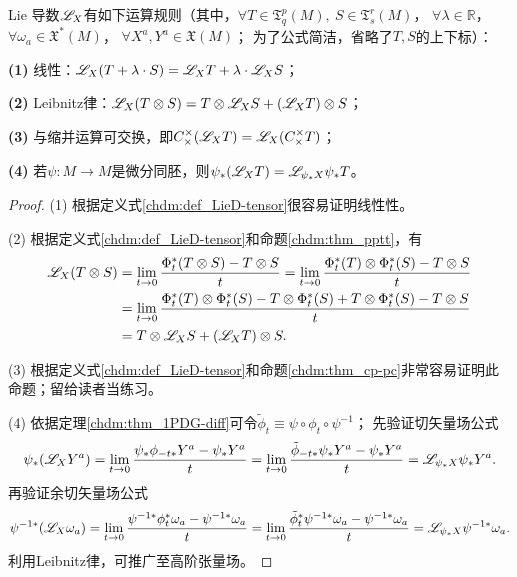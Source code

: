 \begin{theorem}\label{chdm:thm_LieD-property}
    Lie 导数$\mathscr{L}_{X}$有如下运算规则（其中，$\forall T\in \mathfrak{T}^p_q(M),\ S\in \mathfrak{T}^r_s(M)$，
    $\forall \lambda \in \mathbb{R}$， $\forall \omega_a\in \mathfrak{X}^*(M)$，
    $\forall X^a,Y^a\in \mathfrak{X}(M)$；
    为了公式简洁，省略了$T,S$的上下标）：
    
    {\bfseries (1)} 线性：$\mathscr{L}_{X}(T + \lambda \cdot S) = \mathscr{L}_{X}T + \lambda\cdot \mathscr{L}_{X}S$；
    
    {\bfseries (2)} Leibnitz律：$\mathscr{L}_{X} (T \otimes S) = T \otimes \mathscr{L}_{X} S + (\mathscr{L}_{X} T )\otimes S$；
    
    {\bfseries (3)} 与缩并运算可交换，即$C^\times_\times (\mathscr{L}_{X} T) =  \mathscr{L}_{X} (C^\times_\times T) $；
    
    
    
    {\bfseries (4)} 若$\psi:M\to M$是微分同胚，则$\psi_*(\mathscr{L}_{X} T) = \mathscr{L}_{\psi_*X} \psi_* T$。
\end{theorem}
\begin{proof}
    (1) 根据定义式\eqref{chdm:def_LieD-tensor}很容易证明线性性。
    
    (2) 根据定义式\eqref{chdm:def_LieD-tensor}和命题\ref{chdm:thm_pptt}，有
    \begin{align*}
        \mathscr{L}_{X} (T \otimes S) & = \lim_{t\to 0} \frac{\Phi^{*}_{t} (T\otimes S) -T\otimes S }{t} 
          = \lim_{t\to 0} \frac{\Phi^{*}_{t} (T)\otimes \Phi^{*}_{t}(S) -T\otimes S }{t}\\
        & = \lim_{t\to 0} \frac{\Phi^{*}_{t} (T)\otimes \Phi^{*}_{t}(S) 
             -T\otimes \Phi^{*}_{t}(S) +T\otimes \Phi^{*}_{t}(S) -T\otimes S }{t} \\
        & = T \otimes \mathscr{L}_{X} S + (\mathscr{L}_{X} T )\otimes S .
    \end{align*}

    (3) 根据定义式\eqref{chdm:def_LieD-tensor}和命题\ref{chdm:thm_cp-pc}非常容易证明此命题；留给读者当练习。


    (4) 依据定理\ref{chdm:thm_1PDG-diff}可令$\tilde{\phi}_t \equiv \psi \circ \phi_t \circ \psi^{-1}$；
    先验证切矢量场公式
    \begin{equation*}
        \psi_*(\mathscr{L}_{X} Y^a)  = \lim_{t\to 0} \frac{\psi_*{\phi}_{-t*} Y^a - \psi_*Y^a }{t} 
       = \lim_{t\to 0} \frac{\tilde{\phi}_{-t*} \psi_*Y^a -\psi_*Y^a }{t} 
       =\mathscr{L}_{\psi_*X} \psi_*Y^a .
    \end{equation*}
    再验证余切矢量场公式
    \begin{align*}
        \psi^{-1*}(\mathscr{L}_{X} \omega_a)  = \lim_{t\to 0} \frac{\psi^{-1*} {\phi}_{t}^{*} 
            \omega_a - \psi^{-1*}\omega_a }{t} 
        = \lim_{t\to 0} \frac{ \tilde{\phi}_{t}^{*} \psi^{-1*}\omega_a - \psi^{-1*}\omega_a }{t} 
        =\mathscr{L}_{\psi_*X} \psi^{-1*}\omega_a  .
    \end{align*}
    利用Leibnitz律，可推广至高阶张量场。
\end{proof}

